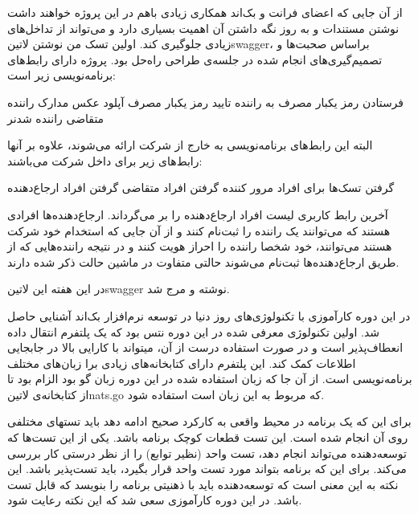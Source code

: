 \documentclass[a4]{report}
\begin{document}
از آن جایی که اعضای فرانت و بک‌اند همکاری زیادی باهم در این پروژه خواهند داشت نوشتن مستندات و به روز نگه داشتن آن اهمیت بسیاری دارد
و می‌تواند از تداخل‌های زیادی جلوگیری کند. اولین تسک من نوشتن ‌لاتین{swagger}، براساس صحبت‌ها و تصمیم‌گیری‌های انجام شده در جلسه‌ی طراحی راه‌حل بود.
پروژه دارای رابط‌های برنامه‌نویسی زیر است:

 فرستادن رمز یکبار مصرف به راننده
 تایید رمز یکبار مصرف
 آپلود عکس مدارک راننده
 متقاضی راننده شدنر

البته این رابط‌های برنامه‌نویسی به خارج از شرکت ارائه می‌شوند، علاوه بر آنها رابط‌های زیر برای داخل شرکت می‌باشند:

 گرفتن تسک‌ها برای افراد مرور کننده
 گرفتن افراد متقاضی
 گرفتن افراد ارجاع‌دهنده

آخرین رابط کاربری لیست افراد ارجاع‌دهنده را بر می‌گرداند. ارجاع‌دهنده‌ها افرادی هستند که می‌توانند یک راننده را ثبت‌نام کنند و از آن جایی که استخدام خود شرکت هستند
می‌توانند، خود شخصا راننده را احراز هویت کنند و در نتیجه راننده‌هایی که از طریق ارجاع‌دهنده‌ها ثبت‌نام می‌شوند حالتی متفاوت در ماشین حالت ذکر شده دارند.

در این هفته این ‌لاتین{swagger} نوشته و مرج شد.

در این دوره کارآموزی با تکنولوژی‌های روز دنیا در توسعه نرم‌افزار بک‌اند آشنایی حاصل شد. اولین تکنولوژی
معرفی شده در این دوره نتس بود که یک پلتفرم انتقال داده انعطاف‌پذیر است و در صورت استفاده درست
از آن، میتواند با کارایی بالا در جابجایی اطلاعات کمک کند. این پلتفرم دارای کتابخانه‌های زیادی برا زبان‌های
مختلف برنامه‌نویسی است. از آن جا که زبان استفاده شده در این دوره زبان گو بود الزام بود تا از کتابخانه‌ی ‌لاتین{nats.go}
که مربوط به این زبان است استفاده شود.

برای این که یک برنامه در محیط واقعی به کارکرد صحیح ادامه دهد باید تستهای مختلفی روی آن انجام شده
است. این تست قطعات کوچک برنامه باشد. یکی از این تست‌ها که توسعه‌دهنده می‌تواند انجام دهد، تست واحد
(نظیر توابع) را از نظر درستی کار بررسی می‌کند.
برای این که برنامه بتواند مورد تست واحد قرار بگیرد، باید تست‌پذیر باشد. این نکته به این معنی است که توسعه‌دهنده باید با ذهنیتی برنامه را بنویسد که قابل تست باشد.
در این دوره کارآموزی سعی شد که این نکته رعایت شود.
\end{document}
